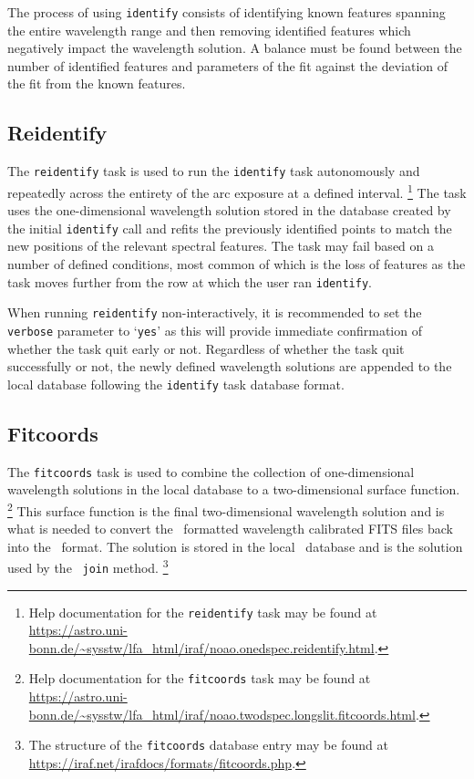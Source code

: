 The process of using \texttt{identify} consists of identifying known features spanning the entire wavelength range and then removing identified features which negatively impact the wavelength solution. A balance must be found between the number of identified features and parameters of the fit against the deviation of the fit from the known features.%

\subsection{Reidentify}

The \texttt{reidentify} task is used to run the \texttt{identify} task autonomously and repeatedly across the entirety of the arc exposure at a defined interval.%
\footnote{Help documentation for the \texttt{reidentify} task may be found at \url{https://astro.uni-bonn.de/~sysstw/lfa_html/iraf/noao.onedspec.reidentify.html}.}
The task uses the one-dimensional wavelength solution stored in the database created by the initial \texttt{identify} call and refits the previously identified points to match the new positions of the relevant spectral features. The task may fail based on a number of defined conditions, most common of which is the loss of features as the task moves further from the row at which the user ran \texttt{identify}.

When running \texttt{reidentify} non-interactively, it is recommended to set the \texttt{verbose} parameter to `\texttt{yes}' as this will provide immediate confirmation of whether the task quit early or not. Regardless of whether the task quit successfully or not, the newly defined wavelength solutions are appended to the local database following the \texttt{identify} task database format.

\subsection{Fitcoords}

The \texttt{fitcoords} task is used to combine the collection of one-dimensional wavelength solutions in the local database to a two-dimensional surface function.%
\footnote{Help documentation for the \texttt{fitcoords} task may be found at \url{https://astro.uni-bonn.de/~sysstw/lfa_html/iraf/noao.twodspec.longslit.fitcoords.html}.}
This surface function is the final two-dimensional wavelength solution and is what is needed to convert the \iraf\ formatted wavelength calibrated \gls{FITS} files back into the \polsalt\ format. The solution is stored in the local \iraf\ database and is the solution used by the \stops\ \texttt{join} method.%
\footnote{The structure of the \texttt{fitcoords} database entry may be found at \url{https://iraf.net/irafdocs/formats/fitcoords.php}.}

